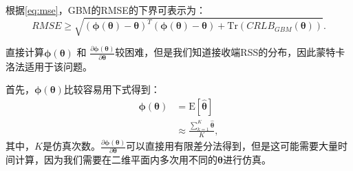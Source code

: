根据\eqref{eq:mse}，GBM的RMSE的下界可表示为：
\begin{equation}
RMSE\! \ge\! \sqrt{{(\bm\phi(\bm{\theta})\! -\! \bm{\theta})}^T(\bm\phi(\bm{\theta})\! -\! \bm{\theta})\! +\! \mathrm{Tr}(CRLB_{GBM}(\bm{\theta}))}.\label{eq:rmse_gbm}
\end{equation}

直接计算$\bm\phi(\bm{\theta})$ 和 ${\frac{\partial\bm\phi(\bm{\theta})}{\partial \bm\theta}}$较困难，但是我们知道接收端RSS的分布，因此蒙特卡洛法适用于该问题。

首先，$\bm\phi(\bm{\theta})$比较容易用下式得到：
\begin{equation}
\begin{split}
\bm\phi(\bm{\theta}) &= \mathrm{E}[\widehat{\bm{\theta}}]\\
&\approx \frac{\sum\limits_{k = 1}^K{\widehat{\bm{\theta}}}}{K},
\end{split}
\end{equation}
其中，$K$是仿真次数。${\frac{\partial\bm\phi(\bm{\theta})}{\partial \bm\theta}}$可以直接用有限差分法得到，但是这可能需要大量时间计算，因为我们需要在二维平面内多次用不同的$\bm\theta$进行仿真。

